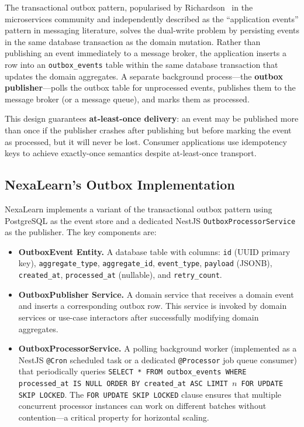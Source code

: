 The transactional outbox pattern, popularised by Richardson~\cite{richardson2018outbox} in the microservices community and independently described as the ``application events'' pattern in messaging literature, solves the dual-write problem by persisting events in the same database transaction as the domain mutation. Rather than publishing an event immediately to a message broker, the application inserts a row into an \texttt{outbox\_events} table within the same database transaction that updates the domain aggregates. A separate background process---the \textbf{outbox publisher}---polls the outbox table for unprocessed events, publishes them to the message broker (or a message queue), and marks them as processed.

This design guarantees \textbf{at-least-once delivery}: an event may be published more than once if the publisher crashes after publishing but before marking the event as processed, but it will never be lost. Consumer applications use idempotency keys to achieve exactly-once semantics despite at-least-once transport.

\subsection{NexaLearn's Outbox Implementation}

NexaLearn implements a variant of the transactional outbox pattern using PostgreSQL as the event store and a dedicated NestJS \texttt{OutboxProcessorService} as the publisher. The key components are:

\begin{itemize}
  \item \textbf{OutboxEvent Entity.} A database table with columns: \texttt{id} (UUID primary key), \texttt{aggregate\_type}, \texttt{aggregate\_id}, \texttt{event\_type}, \texttt{payload} (JSONB), \texttt{created\_at}, \texttt{processed\_at} (nullable), and \texttt{retry\_count}.
  \item \textbf{OutboxPublisher Service.} A domain service that receives a domain event and inserts a corresponding outbox row. This service is invoked by domain services or use-case interactors after successfully modifying domain aggregates.
  \item \textbf{OutboxProcessorService.} A polling background worker (implemented as a NestJS \texttt{@Cron} scheduled task or a dedicated \texttt{@Processor} job queue consumer) that periodically queries \texttt{SELECT * FROM outbox\_events WHERE processed\_at IS NULL ORDER BY created\_at ASC LIMIT $n$ FOR UPDATE SKIP LOCKED}. The \texttt{FOR UPDATE SKIP LOCKED} clause ensures that multiple concurrent processor instances can work on different batches without contention---a critical property for horizontal scaling.
\end{itemize}

